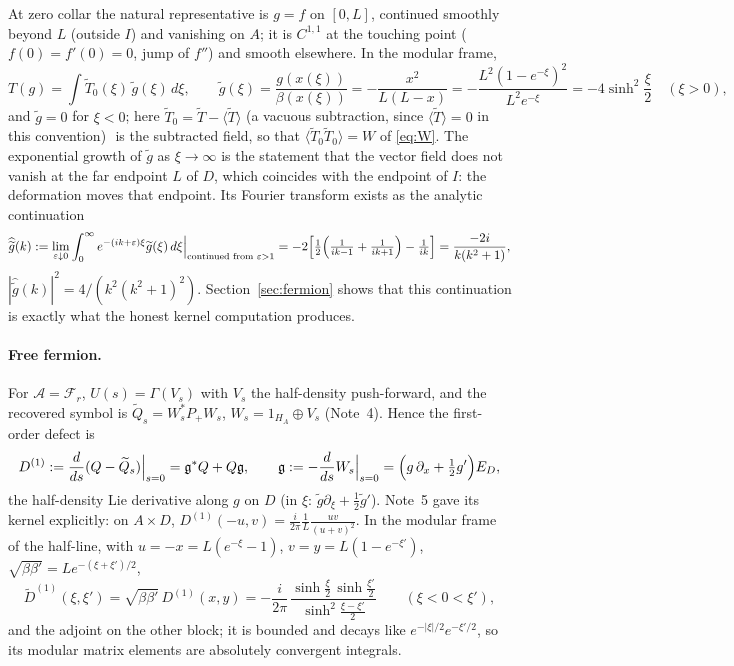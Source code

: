 \documentclass[11pt]{article}
\theoremstyle{accent}
\theoremstyle{definition}
\newcommand{\cF}{\mathcal{F}}
\newcommand{\cA}{\mathcal{A}}
\newcommand{\eps}{\varepsilon}
\newcommand{\gh}{\widehat{\widetilde g}}
\newcommand{\gt}{\widetilde g}
\begin{document}
At zero collar the natural representative is \(g=f\) on \([0,L]\), continued smoothly beyond \(L\) (outside \(I\)) and vanishing on \(A\); it is \(C^{1,1}\) at the touching point (\(f(0)=f'(0)=0\), jump of \(f''\)) and smooth elsewhere.  In the modular frame,
\begin{equation}\label{eq:gtilde}
 T(g)=\int\widetilde T_0(\xi)\,\gt(\xi)\,d\xi,\qquad
 \gt(\xi)=\frac{g(x(\xi))}{\beta(x(\xi))}=-\frac{x^2}{L(L-x)}=-\frac{L^2(1-e^{-\xi})^2}{L^2e^{-\xi}}=-4\sinh^2\frac\xi2\quad(\xi>0),
\end{equation}
and \(\gt=0\) for \(\xi<0\); here \(\widetilde T_0=\widetilde T-\langle\widetilde T\rangle\) (a vacuous subtraction, since \(\langle\widetilde T\rangle=0\) in this convention) \(\) is the subtracted field, so that \(\langle\widetilde T_0\widetilde T_0\rangle=W\) of \eqref{eq:W}.  The exponential growth of \(\gt\) as \(\xi\to\infty\) is the statement that the vector field does not vanish at the far endpoint \(L\) of \(D\), which coincides with the endpoint of \(I\): the deformation moves that endpoint.  Its Fourier transform exists as the analytic continuation
\begin{equation}\label{eq:ghat}
 \gh(k):=\lim_{\eps\downarrow0}\int_0^\infty e^{-(ik+\eps)\xi}\gt(\xi)\,d\xi\Big|_{\text{continued from }\eps>1}
 =-2\Bigl[\tfrac12\Bigl(\tfrac1{ik-1}+\tfrac1{ik+1}\Bigr)-\tfrac1{ik}\Bigr]=\frac{-2i}{k(k^2+1)},
\end{equation}
\(|\gh(k)|^2=4/(k^2(k^2+1)^2)\).  Section~\ref{sec:fermion} shows that this continuation is exactly what the honest kernel computation produces.

\paragraph{Free fermion.}
For \(\cA=\cF_r\), \(U(s)=\Gamma(V_s)\) with \(V_s\) the half-density push-forward, and the recovered symbol is \(\widetilde Q_s=W_s^*P_+W_s\), \(W_s=1_{H_A}\oplus V_s\) (Note~4).  Hence the first-order defect is
\begin{equation}\label{eq:D1-def}
 D^{(1)}:=\frac{d}{ds}(Q-\widetilde Q_s)\Big|_{s=0}=\mathfrak g^*Q+Q\mathfrak g,\qquad
 \mathfrak g:=-\frac{d}{ds}W_s\Big|_{s=0}=\Bigl(g\,\partial_x+\tfrac12g'\Bigr)E_D,
\end{equation}
the half-density Lie derivative along \(g\) on \(D\) (in \(\xi\): \(\gt\partial_\xi+\frac12\gt'\)).  Note~5 gave its kernel explicitly: on \(A\times D\), \(D^{(1)}(-u,v)=\frac{i}{2\pi}\frac{1}{L}\frac{uv}{(u+v)^2}\).  In the modular frame of the half-line, with \(u=-x=L(e^{-\xi}-1)\), \(v=y=L(1-e^{-\xi'})\), \(\sqrt{\beta\beta'}=Le^{-(\xi+\xi')/2}\),
\begin{equation}\label{eq:D1-kernel}
 \boxed{\;\widetilde D^{(1)}(\xi,\xi')=\sqrt{\beta\beta'}\,D^{(1)}(x,y)=-\frac{i}{2\pi}\,\frac{\sinh\frac\xi2\,\sinh\frac{\xi'}2}{\sinh^2\frac{\xi-\xi'}{2}}\qquad(\xi<0<\xi'),\;}
\end{equation}
and the adjoint on the other block; it is bounded and decays like \(e^{-|\xi|/2}e^{-\xi'/2}\), so its modular matrix elements are absolutely convergent integrals.
\end{document}
